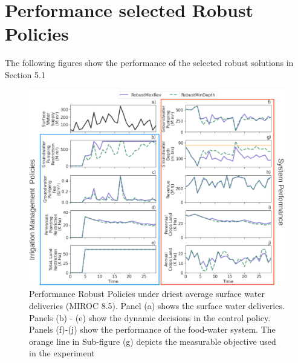 \documentclass[11pt,a4paper]{article}
\begin{document}
\section{Performance selected Robust Policies}

The following figures show the performance of the selected robust solutions in Section 5.1



\begin{figure}[H]
    \centering
    \includegraphics[width=1\textwidth]{./figs/robust_dry_performance.png}
    \caption{Performance Robust Policies under driest average surface water deliveries (MIROC 8.5). Panel (a) shows the surface water deliveries. Panels (b) - (e) show the dynamic decisions in the control policy. Panels (f)-(j) show the performance of the food-water system. The orange line in Sub-figure (g) depicts the measurable objective used in the experiment}
    \label{fig:m1esh1}
\end{figure}
\end{document}
